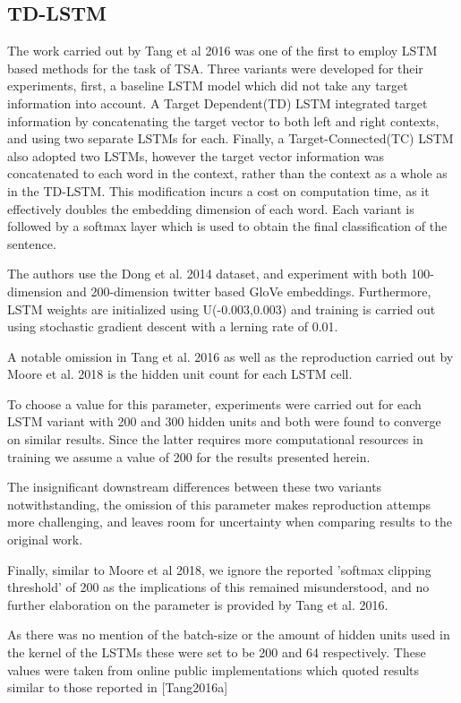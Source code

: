 \documentclass[../../fyp.tex]{subfiles}
\begin{document}
\subsection{TD-LSTM}
The work carried out by Tang et al 2016 was one of the first to employ LSTM based methods for the task of TSA. Three variants were developed for their experiments, first, a baseline LSTM model which did not take any target information into account. A Target Dependent(TD) LSTM integrated target information by concatenating the target vector to both left and right contexts, and using two separate LSTMs for each. Finally, a Target-Connected(TC) LSTM also adopted two LSTMs, however the target vector information was concatenated to each word in the context, rather than the context as a whole as in the TD-LSTM. This modification incurs a cost on computation time, as it effectively doubles the embedding dimension of each word. Each variant is followed by a softmax layer which is used to obtain the final classification of the sentence.  

The authors use the Dong et al. 2014 dataset, and experiment with both 100-dimension and 200-dimension twitter based GloVe embeddings. Furthermore, LSTM weights are initialized using U(-0.003,0.003) and training is carried out using stochastic gradient descent with a lerning rate of 0.01.

A notable omission in Tang et al. 2016 as well as the reproduction carried out by Moore  et al. 2018 is the hidden unit count for each LSTM cell. 

To choose a value for this parameter, experiments were carried out for each LSTM variant with 200 and 300 hidden units and both were found to converge on similar results. Since the latter requires more computational resources in training we assume a value of 200 for the results presented herein. 

The insignificant downstream differences between these two variants notwithstanding, the omission of this parameter makes reproduction attemps more challenging, and leaves room for uncertainty when comparing results to the original work. 

Finally, similar to Moore et al 2018, we ignore the reported 'softmax clipping threshold' of 200 as the implications of this remained misunderstood, and no further elaboration on the parameter is provided by Tang et al. 2016. 

As there was no mention of the batch-size or the amount of hidden units used in the kernel of the LSTMs these were set to be 200 and 64 respectively. These values were taken from online public implementations which quoted results similar to those reported in [Tang2016a]
\end{document}
